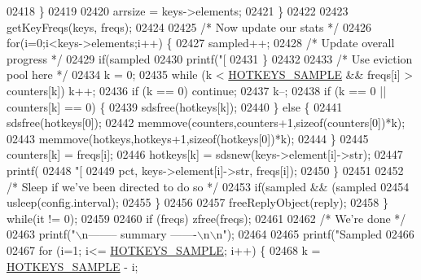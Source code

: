 \begin{DoxyCode}
{{{{{{{{{{{{{{{{{{{{{{{{{{{{{{{{{{{{{{{{{{{{{{{{{{{{{{{{{{{{{{{{{{{{{{{{{{{{{{{02418             \}
02419 
02420             arrsize = keys->elements;
02421         \}
02422 
02423         getKeyFreqs(keys, freqs);
02424 
02425         \textcolor{comment}{/* Now update our stats */}
02426         \textcolor{keywordflow}{for}(i=0;i<keys->elements;i++) \{
02427             sampled++;
02428             \textcolor{comment}{/* Update overall progress */}
02429             \textcolor{keywordflow}{if}(sampled %
02430                 printf(\textcolor{stringliteral}{"[%
02431             \}
02432 
02433             \textcolor{comment}{/* Use eviction pool here */}
02434             k = 0;
02435             \textcolor{keywordflow}{while} (k < \hyperlink{redis-cli_8c_a0f10197c353b6fcaf73df928885167ca}{HOTKEYS\_SAMPLE} && freqs[i] > counters[k]) k++;
02436             \textcolor{keywordflow}{if} (k == 0) \textcolor{keywordflow}{continue};
02437             k--;
02438             \textcolor{keywordflow}{if} (k == 0 || counters[k] == 0) \{
02439                 sdsfree(hotkeys[k]);
02440             \} \textcolor{keywordflow}{else} \{
02441                 sdsfree(hotkeys[0]);
02442                 memmove(counters,counters+1,\textcolor{keyword}{sizeof}(counters[0])*k);
02443                 memmove(hotkeys,hotkeys+1,\textcolor{keyword}{sizeof}(hotkeys[0])*k);
02444             \}
02445             counters[k] = freqs[i];
02446             hotkeys[k] = sdsnew(keys->element[i]->str);
02447             printf(
02448                \textcolor{stringliteral}{"[%
02449                pct, keys->element[i]->str, freqs[i]);
02450         \}
02451 
02452         \textcolor{comment}{/* Sleep if we've been directed to do so */}
02453         \textcolor{keywordflow}{if}(sampled && (sampled %
02454             usleep(config.interval);
02455         \}
02456 
02457         freeReplyObject(reply);
02458     \} \textcolor{keywordflow}{while}(it != 0);
02459 
02460     \textcolor{keywordflow}{if} (freqs) zfree(freqs);
02461 
02462     \textcolor{comment}{/* We're done */}
02463     printf(\textcolor{stringliteral}{"\(\backslash\)n-------- summary -------\(\backslash\)n\(\backslash\)n"});
02464 
02465     printf(\textcolor{stringliteral}{"Sampled %
02466 
02467     \textcolor{keywordflow}{for} (i=1; i<= \hyperlink{redis-cli_8c_a0f10197c353b6fcaf73df928885167ca}{HOTKEYS\_SAMPLE}; i++) \{
02468         k = \hyperlink{redis-cli_8c_a0f10197c353b6fcaf73df928885167ca}{HOTKEYS\_SAMPLE} - i;
}}}}}}}}}}}}}}}}}}}}}}}}}}}}}}}}}}}}}}}}}}}}}}}}}}}}}}}}}}}}}}}}}}}}}}}}}}}}}}}}}}
\end{DoxyCode}
